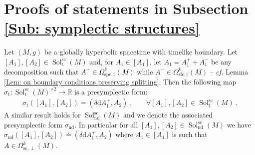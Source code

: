 
\chapter{Proofs of statements in Subsection \ref{Sub: symplectic structures}} %

\label{App: proofs symplectic}



\begin{propositio}\label{Prop: proof presymplectic structure on spacelike solutions with gauge boundary conditions}
	Let $(M,g)$ be a globally hyperbolic spacetime with timelike boundary.
	Let $[A_1],[A_2]\in\operatorname{Sol}_{\mathrm{t}}^{\mathrm{sc}}(M)$ and, for $A_1\in[A_1]$, let $A_1=A_1^++A_1^-$ be any decomposition such that $A^+\in\Omega_{\mathrm{spc,t}}^k(M)$ while $A^-\in\Omega_{\mathrm{sfc,t}}^k(M)$
	-- \textit{cf.} Lemma \ref{Lem: on boundary conditions preserving splitting}.
	Then the following map $\sigma_{\mathrm{t}}\colon\operatorname{Sol}_{\mathrm{t}}^{\mathrm{sc}}(M)^{\times 2}\to\mathbb{R}$ is a presymplectic form:
	\begin{align}\label{Eqn: proof presymplectic structure on solutions with gauge boundary conditions}
	\sigma_{\mathrm{t}}([A_1],[A_2])=
	(\delta\mathrm{d}A_1^+,A_2)\,,\qquad
	\forall [A_1],[A_2]\in\operatorname{Sol}_{\mathrm{t}}^{\mathrm{sc}}(M)\,.
	\end{align}
	A similar result holds for $\operatorname{Sol}_{\mathrm{nd}}^{\mathrm{sc}}(M)$ and we denote the associated presymplectic form $\sigma_{\mathrm{nd}}$.
	In particular for all $[A_1],[A_2]\in\operatorname{Sol}_{\mathrm{nd}}^{\mathrm{sc}}(M)$ we have $\sigma_{\mathrm{nd}}([A_1],[A_2])\doteq(\delta\mathrm{d}A_1^+,A_2)$ where $A_1\in[A_1]$ is such that $A\in\Omega^k_{\mathrm{sc},\perp}(M)$.
\end{propositio}
